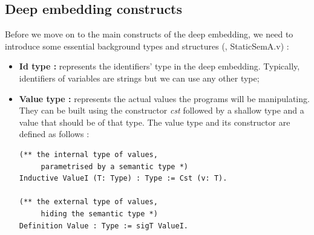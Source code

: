 \subsection{Deep embedding constructs}
\noindent Before we move on to the main constructs of the deep embedding, we need to introduce some essential background types and structures (\cite{DEC}, StaticSemA.v) :
\begin{itemize}
	\item \textbf{Id type :} represents the identifiers' type in the deep embedding. Typically, identifiers of variables are strings but we can use any other type;
	\item \textbf{Value type :} represents the actual values the programs will be manipulating. They can be built using the constructor \textit{cst} followed by a shallow type and a value that should be of that type. The value type and its constructor are defined as follows :
\begin{lstlisting}[caption = {Values in the deep embedding},xleftmargin=.02\textwidth,xrightmargin=.02\textwidth]
(** the internal type of values,
	 parametrised by a semantic type *)
Inductive ValueI (T: Type) : Type := Cst (v: T).

(** the external type of values,
	 hiding the semantic type *)
Definition Value : Type := sigT ValueI.


\end{lstlisting}
\end{itemize}
